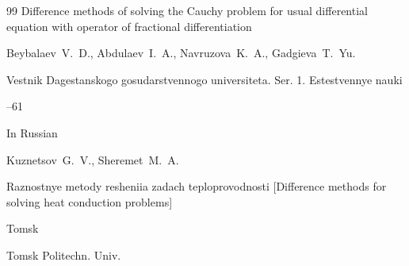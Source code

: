 \begin{thebibliography}{99}
\paper Difference methods of solving the Cauchy problem for usual differential equation with operator of fractional differentiation

\by Beybalaev~V.~D., Abdulaev~I.~A., Navruzova~K.~A., Gadgieva~T.~Yu.

\jour  Vestnik Dagestanskogo gosudarstvennogo universiteta. Ser. 1. Estestvennye nauki



--61




\lang In Russian

\by Kuznetsov~G.~V., Sheremet~M.~A.

\book Raznostnye metody resheniia zadach teploprovodnosti \rm [Difference methods for solving heat conduction problems]

\publaddr Tomsk

\publ Tomsk Politechn. Univ.







\end{thebibliography}









\renewcommand{\baselinestretch}{0.9}



%

